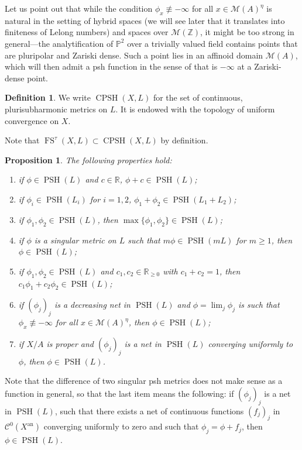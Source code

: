 \documentclass[JEP,XML,SOM,Unicode,published]{cedram}
\newtheorem{prop}[equation]{Proposition}
\theoremstyle{definition}
\newtheorem{defn}[equation]{Definition}
\newcommand \CP {\mathbb P}
\newcommand \R{\mathbb R}
\newcommand \Z{\mathbb Z}
\newcommand \M {\mathscr {M}}
\newcommand{\an}{\mathrm{an}}
\DeclareMathOperator{\CPSH}{CPSH}
\DeclareMathOperator{\FS}{FS}
\DeclareMathOperator{\PSH}{PSH}
\begin{document}
Let us point out that while the condition $ \phi_x \not\equiv - \infty$ for all $x \in \M(A)^{\eta}$ is natural in the setting of hybrid spaces (we will see later that it translates into finiteness of Lelong numbers) and spaces over $\M(\Z)$, it might be too strong in general---the analytification of $\CP^2$ over a trivially valued field contains points that are pluripolar and Zariski dense. Such a point lies in an affinoid domain $\M(A)$, which will then admit a psh function in the sense of \cite{BJtriv} that is $- \infty$ at a Zariski-dense point.
\begin{defn} We write $\CPSH(X, L)$ for the set of continuous, plurisubharmonic metrics on $L$. It is endowed with the topology of uniform convergence on $X$.
\end{defn}
Note that $\FS^{\tau}(X, L) \subset \CPSH(X,L)$ by definition.
\begin{prop} \label{prop psh} The following properties hold:
\begin{enumerate}
\item\label{prop psh1} if $\phi \in \PSH(L)$ and $c \in \R$, $\phi+c \in \PSH(L)$;
\item\label{prop psh2} if $\phi_i \in \PSH(L_i)$ for $i=1,2$, $\phi_1+\phi_2 \in \PSH(L_1+L_2)$;
\item\label{prop psh3} if $\phi_1, \phi_2 \in \PSH(L)$, then $\max \{ \phi_1, \phi_2 \} \in \PSH(L)$;
\item\label{prop psh4} if $\phi$ is a singular metric on $L$ such that $m\phi \in \PSH(mL)$ for $m \ge 1$, then $\phi \in \PSH(L)$;
\item\label{prop psh5} if $\phi_1, \phi_2 \in \PSH(L)$ and $c_1, c_2 \in \R_{\ge 0}$ with $c_1+c_2=1$, then $c_1 \phi_1 + c_2 \phi_2 \in \PSH(L)$;
\item\label{prop psh6} if $(\phi_j)_j$ is a decreasing net in $\PSH(L)$ and $\phi= \lim_j \phi_j$ is such that $\phi_x \not\equiv - \infty$ for all $x \in \M(A)^{\eta}$, then $\phi \in \PSH(L)$;
\item\label{prop psh7} if $X/A$ is proper and $(\phi_j)_j$ is a net in $\PSH(L)$ converging uniformly to $\phi$, then $\phi \in \PSH(L)$.
\end{enumerate}
\end{prop}
Note that the difference of two singular psh metrics does not make sense as a function in general, so that the last item means the following: if $(\phi_j)_j$ is a net in $\PSH(L)$, such that there exists a net of continuous functions $(f_j)_j$ in $\mathcal{C}^0(X^{\an})$ converging uniformly to zero and such that $\phi_j = \phi +f_j$, then $\phi \in \PSH(L)$.
\end{document}
